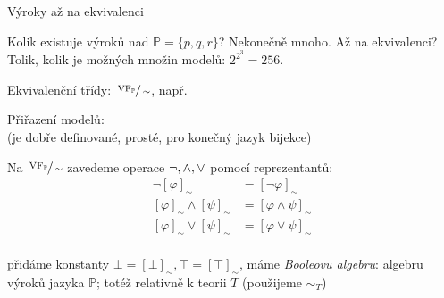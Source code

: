 \documentclass{beamer}
\begin{document}
\begin{frame}{Výroky až na ekvivalenci}

    Kolik existuje výroků nad $\mathbb P=\{p,q,r\}$? Nekonečně mnoho. \alert{Až na ekvivalenci?} Tolik, kolik je možných množin modelů: $2^{2^3}=256$.

    \pause

    \pause
    Ekvivalenční třídy: \alert{$\sfrac{\operatorname{VF}_\mathbb P}{\sim}$}, např. 

    \pause
    Přiřazení modelů: \\        
    (je dobře definované, prosté, pro konečný jazyk bijekce)

    \pause
    Na $\sfrac{\operatorname{VF}_\mathbb P}{\sim}$ zavedeme operace $\neg,{\land},{\lor}$ \alert{pomocí reprezentantů}:
    {\small
    \begin{align*}
        \neg [\varphi]_\sim &=[\neg\varphi]_\sim\\
        [\varphi]_\sim \land [\psi]_\sim &= [\varphi\land\psi]_\sim\\
        [\varphi]_\sim \lor [\psi]_\sim &= [\varphi\lor\psi]_\sim\\
    \end{align*}
    }

    \pause
    \vspace{-18pt}
    přidáme konstanty {\small $\bot=[\bot]_\sim,\top=[\top]_\sim$}, máme \emph{Booleovu algebru}: \alert{algebru výroků} jazyka $\mathbb P$; totéž relativně k teorii $T$ (\alert{použijeme $\sim_T$})

\end{frame}
\end{document}
